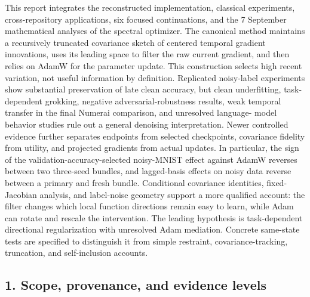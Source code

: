 \documentclass[
  british,
  10pt,
  a4paper,
]{article}
\begin{document}
This report integrates the reconstructed
implementati\allowbreak{}on,\allowbreak{} classical
experiments,\allowbreak{} cross-\allowbreak{}repository
applications\allowbreak{},\allowbreak{} six focused
continuation\allowbreak{}s,\allowbreak{} and the 7 September
mathematical analyses of the spectral optimizer. The canonical method
maintains a recursively truncated covariance sketch of centered temporal
gradient innovations,\allowbreak{} uses its leading space to filter the
raw current gradient, and then relies on AdamW for the parameter update.
This construction selects high recent variation, not useful information
by definition.\allowbreak{} Replicated noisy-\allowbreak{}label
experiments show substantial preservation of late clean accuracy, but
clean underfitting\allowbreak{},\allowbreak{}
task-\allowbreak{}dependent grokking, negative
adversarial-\allowbreak{}robustness results, weak temporal transfer in
the final Numerai comparison,\allowbreak{} and unresolved language-
model behavior studies rule out a general denoising
interpretati\allowbreak{}on.\allowbreak{} Newer controlled evidence
further separates endpoints from selected checkpoints,\allowbreak{}
covariance fidelity from utility, and projected gradients from actual
updates. In particular,\allowbreak{} the sign of the
validation-\allowbreak{}accuracy-\allowbreak{}selected
noisy-\allowbreak{}MNIST effect against AdamW reverses between two
three-seed bundles, and lagged-\allowbreak{}basis effects on noisy data
reverse between a primary and fresh bundle. Conditional covariance
identities,\allowbreak{} fixed-\allowbreak{}Jacobian analysis, and
label-\allowbreak{}noise geometry support a more qualified account: the
filter changes which local function directions remain easy to learn,
while Adam can rotate and rescale the
intervention\allowbreak{}.\allowbreak{} The leading hypothesis is
task-\allowbreak{}dependent directional regularization with unresolved
Adam mediation. Concrete same-state tests are specified to distinguish
it from simple restraint, covariance-\allowbreak{}tracking,\allowbreak{}
truncation,\allowbreak{} and self-\allowbreak{}inclusion accounts.

\subsection{\texorpdfstring{1. Scope, provenance,\allowbreak{} and
evidence
levels}{1. Scope,  and evidence levels}}\label{synthesis--scope-provenance-and-evidence-levels}
\end{document}
